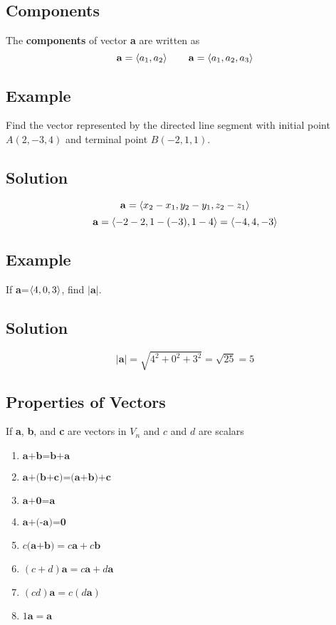 \subsection*{Components}
The \textbf{components} of vector \textbf{a} are written as
$$\mathbf{a}=\ev{a_1,a_2} \qquad \mathbf{a}=\ev{a_1,a_2,a_3}$$

\subsection*{Example}
Find the vector represented by the directed line segment with initial
point $A(2,-3,4)$ and terminal point $B(-2,1,1)$.

\subsection*{Solution}
$$\mathbf{a}=\ev{x_2-x_1,y_2-y_1,z_2-z_1}$$
$$\mathbf{a}=\ev{-2-2,1-(-3),1-4}=\ev{-4,4,-3}$$

\subsection*{Example}
If \textbf{a}=$\ev{4,0,3}$, find $|\textbf{a}|$.

\subsection*{Solution}
$$|\textbf{a}|=\sqrt{4^2+0^2+3^2}=\sqrt{25}=5$$

\subsection*{Properties of Vectors}
If \textbf{a}, \textbf{b}, and \textbf{c} are vectors in $V_n$ and $c$ and $d$ are scalars
\begin{multicols}{2}
    \begin{enumerate}
        \item $\textbf{a+b=b+a}$
        \item $\textbf{a+(b+c)=(a+b)+c}$
        \item $\textbf{a+0=a}$
        \item $\textbf{a+(-a)=0}$
        \item $c\textbf{(a+b)}=c\textbf{a}+c\textbf{b}$
        \item $(c+d)\textbf{a}=c\textbf{a}+d\textbf{a}$
        \item $(cd)\textbf{a}=c(d\textbf{a})$
        \item $1\textbf{a}=\textbf{a}$
    \end{enumerate}
\end{multicols}

